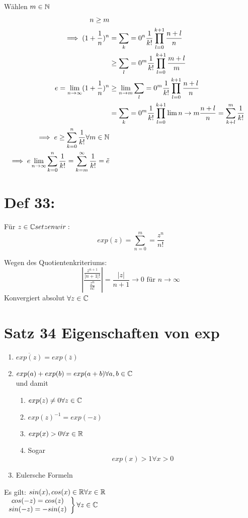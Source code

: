 Wählen $m \in \mathbb{N}$
\begin{equation}
 \begin{split}
  n \ge m \\
  \implies (1 + \frac{1}{n})^n &= \sum_k=0^n \frac{1}{k!} \prod_{l=0}^{k+1} \frac{n+l}{n} \\
			      & \ge \sum_l=0^m \frac{1}{k!} \prod_{l=0}^{k+1} \frac{m+l}{m} \\
  e = \lim_{n \to \infty} (1+\frac{1}{n})^n & \ge \lim_{n\to m} \sum_l=0^m \frac{1}{k!} \prod_{l=0}^{k+1} \frac{n+l}{n} \\
			      & = \sum_k=0^{m} \frac{1}{k!} \prod_{l=0}^{k+1} \lim {n \to m} \frac{n+l}{n} = \sum_{k+l}^m \frac{1}{k!} \\
  \implies e \ge \sum_{k=0}^n \frac{1}{k!} \forall m \in \mathbb{N}  \\
  \implies e \lim_{n \to \infty} \sum_{k=0}^n \frac{1}{k!} = \sum_{k=m}^\infty \frac{1}{k!} = \tilde{e}
  \end{split}
\end{equation}

\section{Def 33:}
Für $z \in \mathbb{C} setzen wir:$ 
$$exp(z) = \sum_{n=0}^m = \frac{z^n}{n!}$$

Wegen des Quotientenkriteriums:
$$\left| \frac{\frac{z^{n+1}}{|n+1|!}}{\frac{z^n}{n!}} \right| = \frac{|z|}{n+1} \to 0 \text{ für } n \to \infty$$
Konvergiert absolut $\forall z \in \mathbb{C}$

\section{Satz 34 Eigenschaften von exp}
\begin{enumerate}
 \item $\overline{exp(z)} = exp(\overline{z})$
 \item $exp(a) + exp(b) = exp(a+b) \forall a,b \in \mathbb{C}$ \\
  und damit \begin{enumerate}
             \item $exp(z) \ne 0 \forall z \in \mathbb{C}$
             \item $exp(z)^{-1} = exp(-z)$
             \item $exp(x) >0 \forall x \in \mathbb{R}$
             \item Sogar $$exp(x) >1 \forall x > 0$$
            \end{enumerate}
  \item Eulersche Formeln %
\end{enumerate}
Es gilt: $sin(x), cos(x) \in \mathbb{R} \forall x \in \mathbb{R}$ \\
$\left.
\begin{array}{cc} %
cos (-z) = cos(z) \\ sin (-z) = -sin(z) 
\end{array}
\right\}
\forall z \in \K
$


